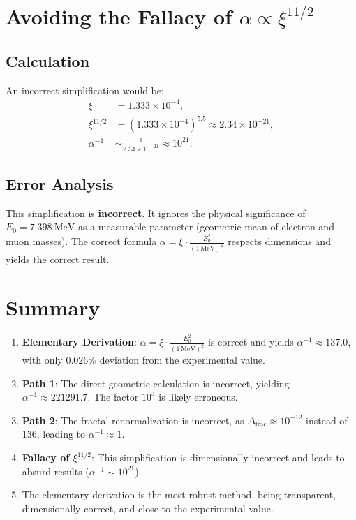 \documentclass[12pt,a4paper]{article}
\theoremstyle{definition}
\begin{document}
	\section{Avoiding the Fallacy of \(\alpha \propto \xi^{11/2}\)}
	\subsection{Calculation}
	An incorrect simplification would be:
	\begin{align}
		\xi &= 1.333 \times 10^{-4}, \\
		\xi^{11/2} &= (1.333 \times 10^{-4})^{5.5} \approx 2.34 \times 10^{-21}, \\
		\alpha^{-1} &\sim \frac{1}{2.34 \times 10^{-21}} \approx 10^{21}.
	\end{align}
	
	\subsection{Error Analysis}
	\begin{tcolorbox}[colback=red!5!white,colframe=deepred,title=Error]
		This simplification is \textbf{incorrect}. It ignores the physical significance of \(E_0 = \SI{7.398}{\MeV}\) as a measurable parameter (geometric mean of electron and muon masses). The correct formula \(\alpha = \xi \cdot \frac{E_0^2}{(1 \, \text{MeV})^2}\) respects dimensions and yields the correct result.
	\end{tcolorbox}
	
	\section{Summary}
	\begin{tcolorbox}[colback=deepblue!5!white,colframe=deepblue,title=Summary]
		\begin{enumerate}
			\item \textbf{Elementary Derivation}: \(\alpha = \xi \cdot \frac{E_0^2}{(1 \, \text{MeV})^2}\) is correct and yields \(\alpha^{-1} \approx 137.0\), with only 0.026\% deviation from the experimental value.
			\item \textbf{Path 1}: The direct geometric calculation is incorrect, yielding \(\alpha^{-1} \approx 221291.7\). The factor \(10^4\) is likely erroneous.
			\item \textbf{Path 2}: The fractal renormalization is incorrect, as \(\Delta_{\text{frac}} \approx 10^{-12}\) instead of 136, leading to \(\alpha^{-1} \approx 1\).
			\item \textbf{Fallacy of \(\xi^{11/2}\)}: This simplification is dimensionally incorrect and leads to absurd results (\(\alpha^{-1} \sim 10^{21}\)).
			\item The elementary derivation is the most robust method, being transparent, dimensionally correct, and close to the experimental value.
		\end{enumerate}
	\end{tcolorbox}
	
\end{document}
